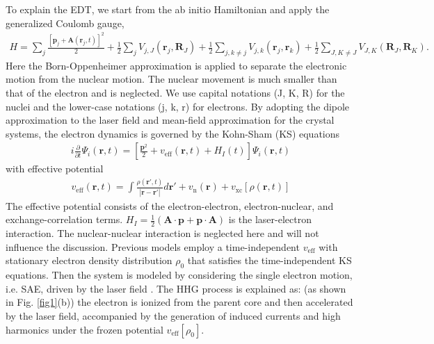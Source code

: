 \documentclass[aps,prl,10pt,preprint,nofootinbib]{revtex4-1}
\begin{document}
To explain the EDT, we start from the ab initio Hamiltonian and apply the generalized Coulomb gauge,
\begin{align}\label{Hamiltonian}
H = \sum_{j}\frac{[\textbf{p}_{j}+\textbf{A}(\textbf{r}_{j},t)]^2}{2}+\frac{1}{2}\sum_{j}V_{j,J}(\textbf{r}_{j},\textbf{R}_{J})+\frac{1}{2}\sum_{j,k\neq j}V_{j,k}(\textbf{r}_{j},\textbf{r}_{k})+\frac{1}{2}\sum_{J,K\neq J}V_{J,K}(\textbf{R}_{J},\textbf{R}_{K}).
\end{align}
Here the Born-Oppenheimer approximation is applied to separate the electronic motion from the nuclear motion. The nuclear movement is much smaller than that of the electron and is neglected. We use capital notations (J, K, R) for the nuclei and the lower-case notations (j, k, r) for electrons. By adopting the dipole approximation to the laser field and mean-field approximation for the crystal systems, the electron dynamics is governed by the Kohn-Sham (KS) equations \cite{Runge1984}
\begin{align}\label{TDDFT}
i\frac{\partial}{\partial t}\Psi_{i}(\textbf{r},t)=[\frac{\textbf{p}^{2}}{2}+v_{\text{eff}}(\textbf{r},t)+H_{I}(t)]\Psi_{i}(\textbf{r},t)
\end{align}
with effective potential
\begin{align}\label{v_efft}
v_{\text{eff}}(\textbf{r},t) = \int\frac{\rho(\textbf{r}',t)}{|\textbf{r}-\textbf{r}'|}d\textbf{r}'+v_{\text{n}}(\textbf{r})+v_{\text{xc}}[\rho(\textbf{r},t)]
\end{align}
The effective potential consists of the electron-electron, electron-nuclear, and exchange-correlation terms. $H_{I} = \frac{1}{2}(\textbf{A}\cdot\textbf{p}+\textbf{p}\cdot\textbf{A})$ is the laser-electron interaction. The nuclear-nuclear interaction is neglected here and will not influence the discussion. Previous models employ a time-independent $v_{\text{eff}}$ with stationary electron density distribution $\rho_{0}$ that satisfies the time-independent KS equations. Then the system is modeled by considering the single electron motion, i.e. SAE, driven by the laser field \cite{Vampa2014,Higuchi2014,Luu2016,Osika2017,Mengxi2017,Mengxi2015,Ikemachi2017,Mengxi2016,Dejean2017,Golde2008,Bian2017,Osika2017,Li2018}. The HHG process is explained as: (as shown in Fig. \ref{fig1}(b)) the electron is ionized from the parent core and then accelerated by the laser field, accompanied by the generation of induced currents and high harmonics under the frozen potential $v_{\text{eff}}[\rho_{0}]$.   
\end{document}
